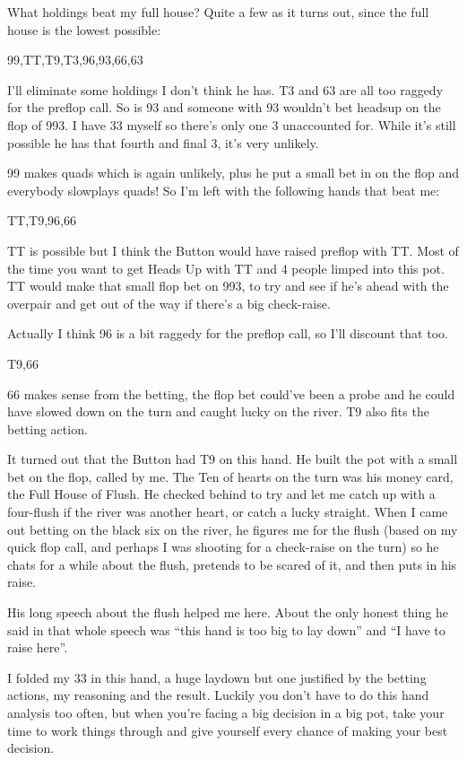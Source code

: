 What holdings beat my full house? Quite a few as it turns out, since
the full house is the lowest possible:

99,TT,T9,T3,96,93,66,63

I'll eliminate some holdings I don't think he has. T3 and 63 are
all too raggedy for the preflop call. So is 93 and someone with 93
wouldn't bet headsup on the flop of 993. I have 33 myself so there's
only one 3 unaccounted for. While it's still possible he has that
fourth and final 3, it's very unlikely.

99 makes quads which is again unlikely, plus he put a small bet in
on the flop and everybody slowplays quads! So I'm left with the following
hands that beat me:

TT,T9,96,66

TT is possible but I think the Button would have raised preflop with TT.
Most of the time you want to get Heads Up with TT and 4 people limped
into this pot. TT would make that small flop bet on 993, to try and see
if he's ahead with the overpair and get out of the way if there's a big
check-raise.

Actually I think 96 is a bit raggedy for the preflop call, so I'll
discount that too.

T9,66

66 makes sense from the betting, the flop bet could've been a probe
and he could have slowed down on the turn and caught lucky on the river.
T9 also fits the betting action.

It turned out that the Button had T9 on this hand.
He built the pot with a small bet on the flop, called by me.
The Ten of hearts on the turn was his money card, the
Full House of Flush. He checked behind
to try and let me catch up with a four-flush if the river was
another heart, or catch a lucky straight.
When I came out betting on the black six on
the river, he figures me for the flush (based on my quick
flop call, and perhaps I was shooting for a check-raise on the turn)
so he chats for a while about the flush, pretends to be scared of it,
and then puts in his raise.

His long speech about the flush helped me here. About
the only honest thing he said in that whole speech was
``this hand is too big to lay down'' and ``I have to raise here''.

I folded my 33 in this hand, a huge laydown but one
justified by the betting actions, my reasoning and the result.
Luckily you don't have to do this hand analysis too often, but
when you're facing a big decision in a big pot, take your time to
work things through and give yourself every chance of making your best
decision.

